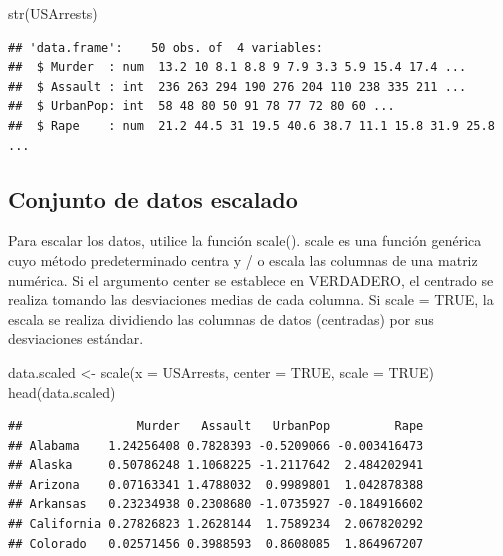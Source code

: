 \documentclass[
]{article}
\newenvironment{Shaded}{\begin{snugshade}}{\end{snugshade}}
\newcommand{\AttributeTok}[1]{\textcolor[rgb]{0.77,0.63,0.00}{#1}}
\newcommand{\ConstantTok}[1]{\textcolor[rgb]{0.00,0.00,0.00}{#1}}
\newcommand{\FunctionTok}[1]{\textcolor[rgb]{0.00,0.00,0.00}{#1}}
\newcommand{\NormalTok}[1]{#1}
\newcommand{\OtherTok}[1]{\textcolor[rgb]{0.56,0.35,0.01}{#1}}
\begin{document}
\begin{Shaded}
\begin{Highlighting}[]
\FunctionTok{str}\NormalTok{(USArrests)}
\end{Highlighting}
\end{Shaded}

\begin{verbatim}
## 'data.frame':    50 obs. of  4 variables:
##  $ Murder  : num  13.2 10 8.1 8.8 9 7.9 3.3 5.9 15.4 17.4 ...
##  $ Assault : int  236 263 294 190 276 204 110 238 335 211 ...
##  $ UrbanPop: int  58 48 80 50 91 78 77 72 80 60 ...
##  $ Rape    : num  21.2 44.5 31 19.5 40.6 38.7 11.1 15.8 31.9 25.8 ...
\end{verbatim}

\hypertarget{conjunto-de-datos-escalado}{%
\subsection{Conjunto de datos
escalado}\label{conjunto-de-datos-escalado}}

Para escalar los datos, utilice la función scale(). scale es una función
genérica cuyo método predeterminado centra y / o escala las columnas de
una matriz numérica. Si el argumento center se establece en VERDADERO,
el centrado se realiza tomando las desviaciones medias de cada columna.
Si scale = TRUE, la escala se realiza dividiendo las columnas de datos
(centradas) por sus desviaciones estándar.

\begin{Shaded}
\begin{Highlighting}[]
\NormalTok{data.scaled }\OtherTok{\textless{}{-}} \FunctionTok{scale}\NormalTok{(}\AttributeTok{x =}\NormalTok{ USArrests,}
                     \AttributeTok{center =} \ConstantTok{TRUE}\NormalTok{,}
                     \AttributeTok{scale =} \ConstantTok{TRUE}\NormalTok{)}
\FunctionTok{head}\NormalTok{(data.scaled)}
\end{Highlighting}
\end{Shaded}

\begin{verbatim}
##                Murder   Assault   UrbanPop         Rape
## Alabama    1.24256408 0.7828393 -0.5209066 -0.003416473
## Alaska     0.50786248 1.1068225 -1.2117642  2.484202941
## Arizona    0.07163341 1.4788032  0.9989801  1.042878388
## Arkansas   0.23234938 0.2308680 -1.0735927 -0.184916602
## California 0.27826823 1.2628144  1.7589234  2.067820292
## Colorado   0.02571456 0.3988593  0.8608085  1.864967207
\end{verbatim}
\end{document}
